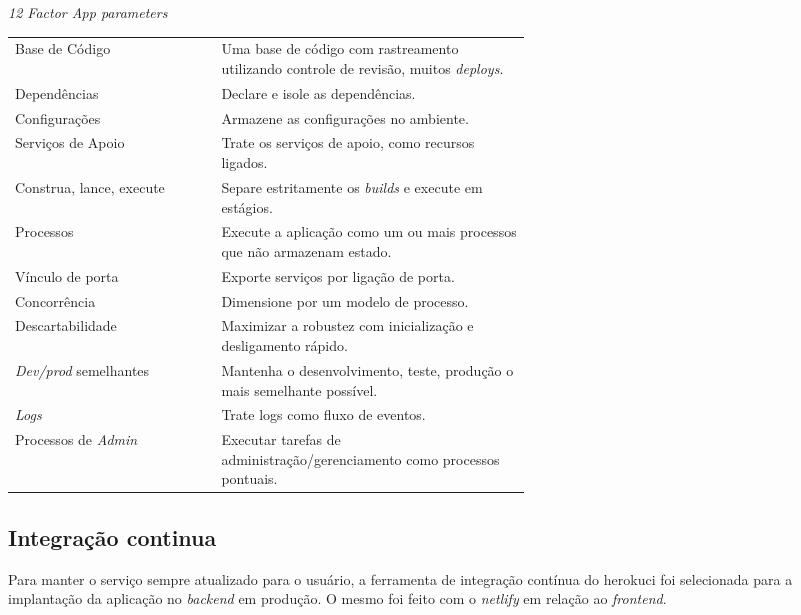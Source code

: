 \begin{quadro}[H]
	\caption{\textit{12 Factor App parameters}}
	\centering
	\begin{tabular}{| l | p{0.6\linewidth}|}
		\hline
		\thead[l]{Parâmetros} & \thead[l]{Descrição}\\
		\hline
		Base de Código 	& Uma base de código com rastreamento utilizando controle de revisão, muitos \textit{\glspl{deploy}}.\\
		\hline
		Dependências	& Declare e isole as dependências.\\
		\hline
		Configurações	& Armazene as configurações no ambiente.\\
		\hline
		Serviços de Apoio	& Trate os serviços de apoio, como recursos ligados.\\
		\hline
		Construa, lance, execute & Separe estritamente os \textit{builds} e execute em estágios.\\
		\hline
		 Processos & Execute a aplicação como um ou mais processos que não armazenam estado.\\
		\hline
		Vínculo de porta & Exporte serviços por ligação de porta.\\
		\hline
		Concorrência & Dimensione por um modelo de processo.\\
		\hline
		Descartabilidade & Maximizar a robustez com inicialização e desligamento rápido.\\
		\hline
		\textit{Dev/prod} semelhantes & Mantenha o desenvolvimento, teste, produção o mais semelhante possível. \\
		\hline
		\textit{Logs} & Trate logs como fluxo de eventos.\\
		\hline
		Processos de \textit{Admin} & Executar tarefas de administração/gerenciamento como processos pontuais.\\
		\hline
	\end{tabular}
	\label{12-factor}
\end{quadro}

\subsection{Integração continua}
Para manter o serviço sempre atualizado para o usuário, a ferramenta de integração contínua do \gls{herokuci} foi selecionada para a implantação da aplicação no \textit{\gls{backend}} em produção. O mesmo foi feito com o \textit{\gls{netlify}} em relação ao\textit{ \gls{frontend}}.
